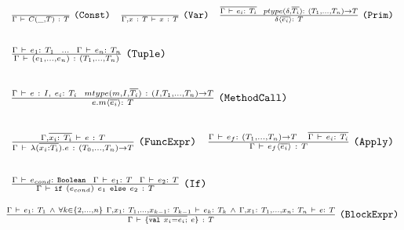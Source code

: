 
\begin{center}
\(\begin{array}{c c c}
	\frac{}{\Der{\Gamma}{C(\_, T)~:~T}}~\lst{(Const)}
	& 
	\frac{}{\Der{\Gamma,x~:~T}{x~:~T}}~\lst{(Var)}
	&
	\frac{
		\Ov{\DerEnv{e_i:~T_i}}~~
		ptype(\delta, \Ov{T_i}) :~(T_1,\dots,T_n) \to T
	}{
		\Apply{\delta}{\Ov{e_i}}:~T
	}~\lst{(Prim)} \\
	& & \\ %
\end{array}\) 


\(\begin{array}{c}
\frac{\DerEnv{e_1 :~T_1}~~\dots~~\DerEnv{e_n :~T_n}}
     {\DerEnv{(e_1,\dots,e_n)~:~(T_1,\dots,T_n)}}~\lst{(Tuple)} \\
\\ %
\end{array}\) 

\(\begin{array}{c}
\frac{
		\DerEnv{e~:~I,~e_i:~T_i}~~
		mtype(m, I, \Ov{T_i})~:~(I, T_1,\dots,T_n) \to T
	}
	{ \Apply{e.m}{\Ov{e_i}}:~T }~\lst{(MethodCall)} \\
\\ %
\end{array}\) 

\(\begin{array}{c c}
	\frac{\Der{\TEnv,\Ov{x_i:~T_i}}{e~:~T}}
	     {\Der{\Gamma}{\TyLam{x_i}{T_i}{e}~:~(T_0,\dots,T_n) \to T}}~\lst{(FuncExpr)}
		  & 
	\frac{ \Der{\TEnv}{e_f:~(T_1,\dots,T_n) \to T}~~~\Ov{\Der{\TEnv}{e_i:~T_i}} }
		 { \Der{\Gamma}{\Apply{e_f}{\Ov{e_i}}~:~T} }~\lst{(Apply)} \\
& \\ %
\end{array}\) 

\(\begin{array}{c c}
	\frac{ \DerEnv{e_{cond} :~\lst{Boolean}}~~\DerEnv{e_1 :~T}~~\DerEnv{e_2 :~T} }
		{ \DerEnv{\IfThenElse{e_{cond}}{e_1}{e_2}~:~T} }~\lst{(If)}
		 & 
		 \\
		 & \\ %
\end{array}\) 
\(
	\frac{ 
		\DerEnv{e_1 :~T_1}~\wedge~
		\forall k\in\{2,\dots,n\}~\Der{\Gamma,x_1:~T_1,\dots,x_{k-1}:~T_{k-1}}{e_k:~T_k}~\wedge~
        \Der{\Gamma,x_1:~T_1,\dots,x_n:~T_n}{e:~T}
		}
		{ \DerEnv{\{ \Ov{\text{\lst{val}}~x_i = e_i;}~e\}~:~T} }~\lst{(BlockExpr)}
\)


\end{center}


